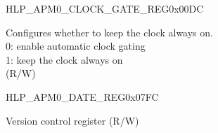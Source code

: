 \begin{register}{H}{LP\_APM0\_CLOCK\_GATE\_REG}{0x00DC}\label{regdesc:LPAPM0CLOCKGATEREG}
%
%
\regnewline%
\begin{regdesc}\begin{reglist}
\label{fielddesc:LPAPM0CLKEN}\item [LP\_APM0\_CLK\_EN] Configures whether to keep the clock always on.\\ 
0: enable automatic clock gating \\ 
1: keep the clock always on  \\ (R/W)
\end{reglist}\end{regdesc}
\end{register}


\begin{register}{H}{LP\_APM0\_DATE\_REG}{0x07FC}\label{regdesc:LPAPM0DATEREG}
%
%
\regnewline%
\begin{regdesc}\begin{reglist}
\label{fielddesc:LPAPM0DATE}\item [LP\_APM0\_DATE] Version control register (R/W)
\end{reglist}\end{regdesc}
\end{register}
